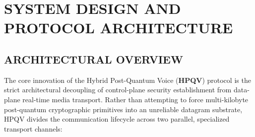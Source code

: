 \chapter{SYSTEM DESIGN AND PROTOCOL ARCHITECTURE}

\section{ARCHITECTURAL OVERVIEW}
The core innovation of the Hybrid Post-Quantum Voice (\textbf{HPQV}) protocol is the strict architectural decoupling of control-plane security establishment from data-plane real-time media transport. Rather than attempting to force multi-kilobyte post-quantum cryptographic primitives into an unreliable datagram substrate, HPQV divides the communication lifecycle across two parallel, specialized transport channels:

